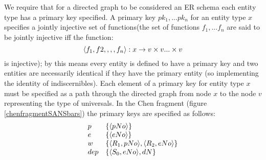 \documentclass[10pt,a4paper]{article}
\newcommand{\set}[1]{\left\{#1\right\}}
\newcommand{\veee}{v}
\begin{document}
We require that 
for a directed graph to be considered an ER schema each entity type has a primary
key specified. 
A primary key $pk_1,...pk_n$ for an entity type $x$ specifies a jointly injective set of functions(the set of functions $f_1,...f_n$ are said to be jointly injective iff the function:
$$
\tuple{f_1,f2,,,,f_n}: x \morph \veee \times \veee ... \times \veee
$$
is injective); by this means every entity is defined to have a primary key and two entities are necessarily identical if they have the primary entity (so implementing the identity of indiscernibles). Each element of a primary key for entity type $x$ must be specified as a path through the directed graph from node $x$ to the node $\veee$ representing the type of universals.  In the Chen fragment (figure \ref{chenfragmentSANSbars}) the primary keys are specified as follows:
$$
\begin{array}{l l}
p & \set{\tuple{pNo}} \\
e & \set{\tuple{eNo}} \\
w & \set{\tuple{R_1,pNo},\tuple{R_2,eNo}} \\
dep & \set{\tuple{S_0,eNo},dN}
\end{array}
$$
\end{document}

